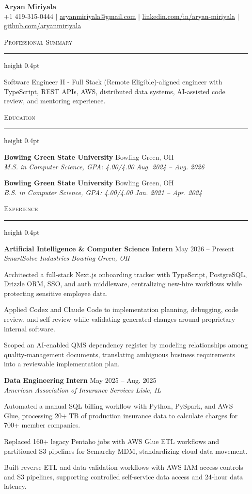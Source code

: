 \documentclass[letterpaper,11pt]{article}
\newcommand{\resumesection}[1]{%
  \par\vspace{2pt}%
  {\large\scshape #1}\par\vspace{2pt}%
  \hrule height 0.4pt\vspace{2pt}%
}
\newcommand{\resumeSubheading}[4]{
  \textbf{#1} \hfill #2\\
  \textit{#3} \hfill \textit{#4}
}
\begin{document}
\begin{center}
  {\LARGE \textbf{Aryan Miriyala}}\\[-1pt]
  \small
  +1 419-315-0444 $|$
  \href{mailto:aryanmiriyala@gmail.com}{aryanmiriyala@gmail.com} $|$
  \href{https://www.linkedin.com/in/aryan-miriyala-7788a21b6/}{linkedin.com/in/aryan-miriyala} $|$
  \href{https://github.com/aryanmiriyala}{github.com/aryanmiriyala}
\end{center}\vspace{-10pt}

\resumesection{Professional Summary}
Software Engineer II - Full Stack (Remote Eligible)-aligned engineer with TypeScript, REST APIs, AWS, distributed data systems, AI-assisted code review, and mentoring experience.

\resumesection{Education}
\resumeSubheading
{Bowling Green State University}{Bowling Green, OH}
{M.S. in Computer Science, GPA: 4.00/4.00}{Aug. 2024 -- Aug. 2026}

\resumeSubheading
{Bowling Green State University}{Bowling Green, OH}
{B.S. in Computer Science, GPA: 4.00/4.00}{Jan. 2021 -- Apr. 2024}

\resumesection{Experience}
\resumeSubheading
{Artificial Intelligence \& Computer Science Intern}{May 2026 -- Present}
{SmartSolve Industries}{Bowling Green, OH}
\begin{tightitemize}
  \item Architected a full-stack Next.js onboarding tracker with TypeScript, PostgreSQL, Drizzle ORM, SSO, and auth middleware, centralizing new-hire workflows while protecting sensitive employee data.
  \item Applied Codex and Claude Code to implementation planning, debugging, code review, and self-review while validating generated changes around proprietary internal software.
  \item Scoped an AI-enabled QMS dependency register by modeling relationships among quality-management documents, translating ambiguous business requirements into a reviewable implementation plan.
\end{tightitemize}

\resumeSubheading
{Data Engineering Intern}{May 2025 -- Aug. 2025}
{American Association of Insurance Services}{Lisle, IL}
\begin{tightitemize}
  \item Automated a manual SQL billing workflow with Python, PySpark, and AWS Glue, processing 20+ TB of production insurance data to calculate charges for 700+ member companies.
  \item Replaced 160+ legacy Pentaho jobs with AWS Glue ETL workflows and partitioned S3 pipelines for Semarchy MDM, standardizing cloud data movement.
  \item Built reverse-ETL and data-validation workflows with AWS IAM access controls and S3 pipelines, supporting controlled self-service data access and 24-hour data latency.
\end{tightitemize}
\end{document}
